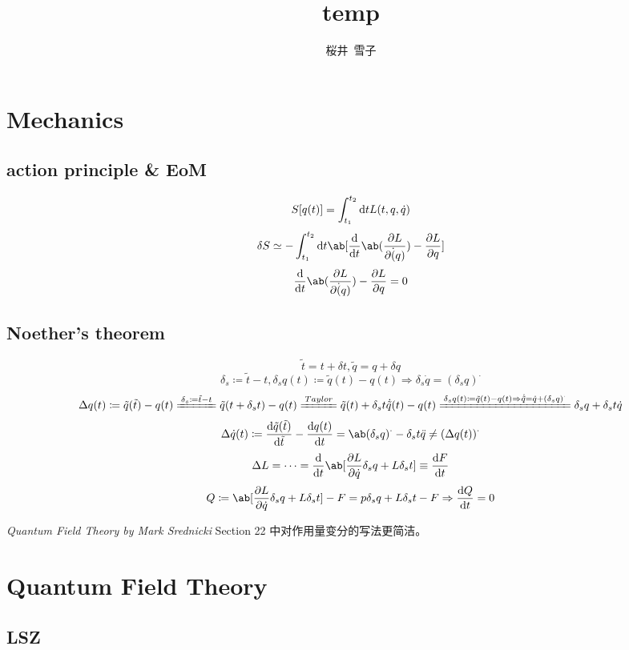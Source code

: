 \documentclass{article}
\title{temp}
\author{桜井\ 雪子}
\newcommand{\xleq}{\xlongequal}
\begin{document}
\maketitle
\tableofcontents

\section{Mechanics}

\subsection{action principle \& EoM}

\[ S[q(t)] = \int_{t_1}^{t_2} \odif{t} L(t, q, \dot{q}) \]
\[ \delta S \simeq - \int_{t_1}^{t_2} \odif{t} \ab[\odv{}{t} \ab(\pdv{L}{\dot(q)}) - \pdv{L}{q}] \]
\[ \odv{}{t} \ab(\pdv{L}{\dot(q)}) - \pdv{L}{q} = 0 \]

\subsection{Noether's theorem}

\[ \tilde{t} = t + \delta t, \tilde{q} = q + \delta q \]
\[ \delta_s \coloneqq \tilde{t} - t, \delta_s q(t) \coloneqq \tilde{q}(t) - q(t) \Rightarrow \delta_s \dot{q} = (\delta_s q)^{\cdot} \]
\[ \Delta q(t) \coloneqq \tilde{q}(\tilde{t}) - q(t) \xleq{\delta_s \coloneqq \tilde{t} - t}  \tilde{q}(t + \delta_s t) - q(t) \xleq{Taylor} \tilde{q}(t) + \delta_s t \dot{\tilde{q}}(t) - q(t) \xleq{\delta_s q(t) \coloneqq \tilde{q}(t) - q(t) \Rightarrow \dot{\tilde{q}} = \dot{q} + (\delta_s q)^{\cdot}} \delta_s q + \delta_s t \dot{q} \]
\[ \Delta \dot{q}(t) \coloneqq \odv{\tilde{q}(\tilde{t})}{\tilde{t}} - \odv{q(t)}{t} = \ab(\delta_s q)^{\cdot} - \delta_s t \ddot{q} \neq (\Delta q(t))^{\cdot} \]
\[ \Delta L = \cdots = \odv{}{t} \ab[\pdv{L}{\dot{q}} \delta_s q + L \delta_s t] \equiv \odv{F}{t} \]
\[ Q \coloneqq \ab[\pdv{L}{\dot{q}} \delta_s q + L \delta_s t] - F = p \delta_s q + L \delta_s t - F \Rightarrow \odv{Q}{t} = 0 \]

\textit{Quantum Field Theory by Mark Srednicki} Section 22 中对作用量变分的写法更简洁。

\section{Quantum Field Theory}

\subsection{LSZ}
\end{document}
